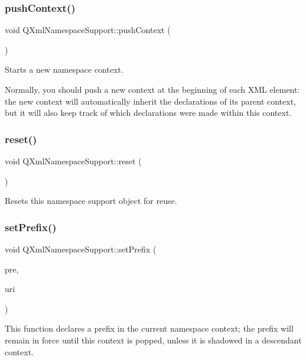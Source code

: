\subsubsection{\texorpdfstring{pushContext()}{pushContext()}}
{\footnotesize\ttfamily void Q\+Xml\+Namespace\+Support\+::push\+Context (\begin{DoxyParamCaption}{ }\end{DoxyParamCaption})}

Starts a new namespace context.

Normally, you should push a new context at the beginning of each X\+ML element\+: the new context will automatically inherit the declarations of its parent context, but it will also keep track of which declarations were made within this context. \mbox{\label{class_q_xml_namespace_support_a9a8940bd95ef75274b9560c3e4358bce}} 
\subsubsection{\texorpdfstring{reset()}{reset()}}
{\footnotesize\ttfamily void Q\+Xml\+Namespace\+Support\+::reset (\begin{DoxyParamCaption}{ }\end{DoxyParamCaption})}

Resets this namespace support object for reuse. \mbox{\label{class_q_xml_namespace_support_a21b28d3ac78e3226fe29d8b31d4fbf34}} 
\subsubsection{\texorpdfstring{setPrefix()}{setPrefix()}}
{\footnotesize\ttfamily void Q\+Xml\+Namespace\+Support\+::set\+Prefix (\begin{DoxyParamCaption}\item[{const \mbox{\hyperlink{class_q_string}{Q\+String}} \&}]{pre,  }\item[{const \mbox{\hyperlink{class_q_string}{Q\+String}} \&}]{uri }\end{DoxyParamCaption})}

This function declares a prefix in the current namespace context; the prefix will remain in force until this context is popped, unless it is shadowed in a descendant context.

